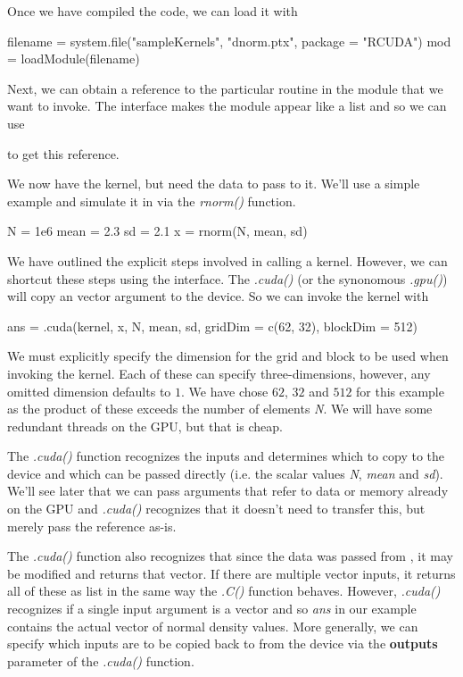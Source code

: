 \documentclass[article]{jss}
\def\R{\proglang{R}}
\def\Rfunc#1{\textsl{#1()}}
\def\Rvar#1{\textsl{#1}}
\def\Rarg#1{\textbf{#1}}
\begin{document}
Once we have compiled the code, we can load it with
\begin{RCode}
filename = system.file("sampleKernels", "dnorm.ptx", package = "RCUDA")
mod = loadModule(filename)
\end{RCode}
Next, we can obtain a reference to the particular routine in the
module  that we want to invoke.  The \R{} interface makes the module
appear like a list and so we can use
to get this reference.

We now have the kernel, but need the data to pass to it.  We'll use a simple example
and simulate it in \R{} via the \Rfunc{rnorm} function.
\begin{RCode}
N = 1e6
mean = 2.3
sd =  2.1
x = rnorm(N, mean, sd)
\end{RCode}

We have outlined the explicit steps involved in calling a kernel.
However, we can shortcut these steps using the \R{} interface.  The
\Rfunc{.cuda} (or the synonomous \Rfunc{.gpu}) will copy an \R{} vector
argument to the device. So we can invoke the kernel with
\begin{RCode}
ans = .cuda(kernel, x, N, mean, sd, gridDim = c(62, 32), blockDim = 512)
\end{RCode}
We must explicitly specify the dimension for the grid and block to be
used when invoking the kernel. Each of these can specify
three-dimensions, however, any omitted dimension defaults to $1$.
We have chose $62$, $32$ and $512$ for this example as the product
of these exceeds the number of elements \Rvar{N}. We will have some
redundant threads on the GPU, but that is cheap.

The \Rfunc{.cuda} function recognizes the inputs and determines which
to copy to the device and which can be passed directly (i.e. the
scalar values \Rvar{N}, \Rvar{mean} and \Rvar{sd}). We'll see later
that we can pass arguments that refer to data or memory already on the
GPU and \Rfunc{.cuda} recognizes that it doesn't need to transfer
this, but merely pass the reference as-is.

The \Rfunc{.cuda} function also recognizes that since the data was
passed from \R{}, it may be modified and returns that vector.  If
there are multiple vector inputs, it returns all of these as list in
the same way the \Rfunc{.C} function behaves. However, \Rfunc{.cuda}
recognizes if a single input argument is a vector and so \Rvar{ans} in
our example contains the actual vector of normal density values.  More
generally, we can specify which inputs are to be copied back to \R{}
from the device via the \Rarg{outputs} parameter of the \Rfunc{.cuda}
function.
\end{document}
